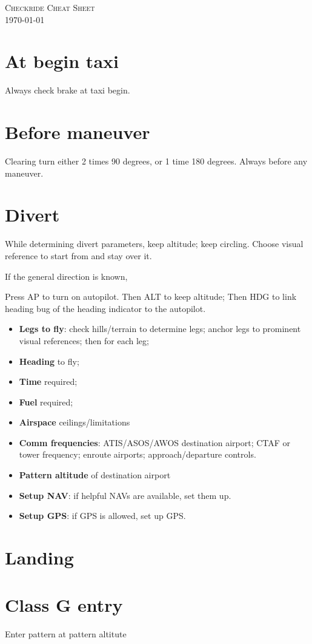 \documentclass[article,9pt,landscape]{memoir}
\begin{document}



\begin{multicols*}{4}
  \textsc{Checkride Cheat Sheet\\\today\\[0.5em]}

  \chapter{At begin taxi}
  Always check brake at taxi begin.

  \chapter{Before maneuver}
  Clearing turn either 2 times 90 degrees, or 1
  time 180 degrees.  Always before any maneuver.

  \chapter{Divert}
  While determining divert parameters, keep altitude; keep circling.  Choose
  visual reference to start from and stay over it.

  If the general direction is known, 

   Press \textsc{AP} to turn on autopilot.  Then
  \textsc{ALT} to keep altitude; Then \textsc{HDG} to link heading bug
  of the heading indicator to the autopilot.

  \begin{itemize}
  \item \textbf{Legs to fly}: check hills/terrain to determine legs;
    anchor legs to prominent visual references; then for each leg;
    \item \textbf{Heading} to fly; 
    \item \textbf{Time} required; 
    \item \textbf{Fuel} required;
    \item \textbf{Airspace} ceilings/limitations
    \item \textbf{Comm frequencies}: ATIS/ASOS/AWOS destination
      airport; CTAF or tower frequency; enroute airports;
      approach/departure controls.
    \item \textbf{Pattern altitude} of destination airport
    \item \textbf{Setup NAV}: if helpful NAVs are available, set them up.
    \item \textbf{Setup GPS}: if GPS is allowed, set up GPS.
  \end{itemize}

  \chapter{Landing}
  \chapter{Class G entry}
  Enter pattern at pattern altitute

  

\end{multicols*}
\end{document}
